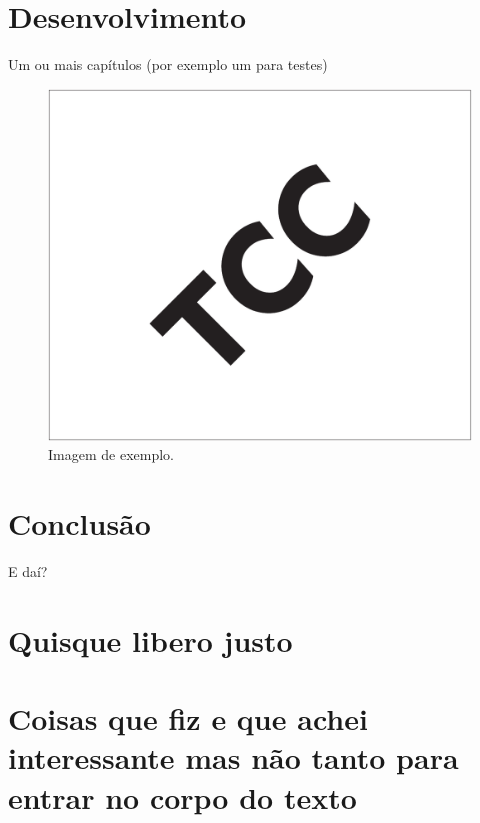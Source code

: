 \documentclass[12pt, %
openright, 
oneside, %
a4paper,    %
brazil]{facom-ufu-abntex2}
\begin{document}
\chapter{Desenvolvimento}
Um ou mais capítulos (por exemplo um para testes)

\begin{figure}[!ht]
	\centering
	\includegraphics[width=0.55\linewidth]{imagemExemplo.pdf}
	\caption[Isso é o que aparece no sumário]{Imagem de exemplo.}
	\label{fig:graficosVariandoTamanhoRede}
\end{figure}


\chapter[Conclusão]{Conclusão}
E daí?

\postextual




\begin{apendicesenv}

	\partapendices

	\chapter{Quisque libero justo}

	\lipsum[50]

	\chapter{Coisas que fiz e que achei interessante mas não tanto para entrar no corpo do texto}
	\lipsum[55-57]

\end{apendicesenv}
\end{document}
